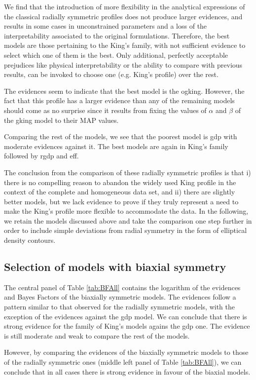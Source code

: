 We find that the introduction of more flexibility in the
analytical expressions of the classical radially symmetric profiles
does not produce larger evidences, and results in some cases in
unconstrained parameters and a loss of the interpretability associated
to the original formulations. Therefore, the best models are those pertaining to the King's family,
with not sufficient evidence to select which one of them is the best. Only
additional, perfectly acceptable prejudices like physical
interpretability or the ability to compare with previous results, can
be invoked to choose one (e.g. King's profile) over the rest.

The evidences seem 
to indicate that the best model is the \gls{ogking}.  
However, the fact that this profile has a larger evidence than any of the
remaining models should come as no surprise since it results from fixing
the values of $\alpha$ and $\beta$ of the \gls{gking} model to their MAP 
values. 

Comparing the rest of the models, we see that the poorest model is \gls{gdp} with moderate evidences against it. 
The best models are again in King's family followed by \gls{rgdp} and \gls{eff}.

The conclusion from the comparison of these radially symmetric
profiles is that i) there is no
compelling reason to abandon the widely used King profile in the
context of the complete and homogeneous data set,
and ii) there are slightly better models, but we lack evidence to prove if they truly 
represent a need to make the King's
profile more flexible to accommodate the data. 
In the following, we retain the models discussed above and
take the comparison one step further in order to include simple
deviations from radial symmetry in the form of elliptical density
contours.

\subsection{Selection of models with biaxial symmetry}
The central panel of  Table \ref{tab:BFAll} contains the
logarithm of the evidences and Bayes Factors of the biaxially symmetric models. The evidences follow a pattern similar to 
that observed for the radially symmetric models, with the exception of the evidences against the \gls{gdp} model. We can conclude that there is
strong evidence for the family of King's models agains the \gls{gdp} one.
The evidence is still moderate and weak to compare the rest of the models.

However, by comparing the evidences of the biaxially symmetric models to those of the radially symmetric ones (middle left panel of  Table \ref{tab:BFAll}), 
we can conclude that in all cases there is strong evidence in favour of the biaxial models.


